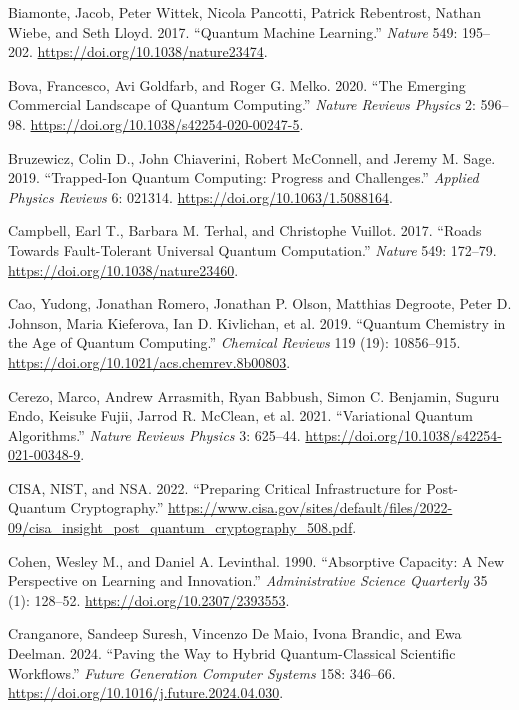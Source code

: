 \documentclass[
  11pt,
  letterpaper,
]{article}
\newlength{\cslhangindent}
\newenvironment{CSLReferences}[2] %
 {\begin{list}{}{%
  \setlength{\itemindent}{0pt}
  \setlength{\leftmargin}{0pt}
  \setlength{\parsep}{0pt}
  \ifodd #1
   \setlength{\leftmargin}{\cslhangindent}
   \setlength{\itemindent}{-1\cslhangindent}
  \fi
  \setlength{\itemsep}{#2\baselineskip}}}
 {\end{list}}
\begin{document}
\begin{CSLReferences}{1}{0}
Biamonte, Jacob, Peter Wittek, Nicola Pancotti, Patrick Rebentrost,
Nathan Wiebe, and Seth Lloyd. 2017. {``Quantum Machine Learning.''}
\emph{Nature} 549: 195--202. \url{https://doi.org/10.1038/nature23474}.

Bova, Francesco, Avi Goldfarb, and Roger G. Melko. 2020. {``The Emerging
Commercial Landscape of Quantum Computing.''} \emph{Nature Reviews
Physics} 2: 596--98. \url{https://doi.org/10.1038/s42254-020-00247-5}.

Bruzewicz, Colin D., John Chiaverini, Robert McConnell, and Jeremy M.
Sage. 2019. {``Trapped-Ion Quantum Computing: Progress and
Challenges.''} \emph{Applied Physics Reviews} 6: 021314.
\url{https://doi.org/10.1063/1.5088164}.

Campbell, Earl T., Barbara M. Terhal, and Christophe Vuillot. 2017.
{``Roads Towards Fault-Tolerant Universal Quantum Computation.''}
\emph{Nature} 549: 172--79. \url{https://doi.org/10.1038/nature23460}.

Cao, Yudong, Jonathan Romero, Jonathan P. Olson, Matthias Degroote,
Peter D. Johnson, Maria Kieferova, Ian D. Kivlichan, et al. 2019.
{``Quantum Chemistry in the Age of Quantum Computing.''} \emph{Chemical
Reviews} 119 (19): 10856--915.
\url{https://doi.org/10.1021/acs.chemrev.8b00803}.

Cerezo, Marco, Andrew Arrasmith, Ryan Babbush, Simon C. Benjamin, Suguru
Endo, Keisuke Fujii, Jarrod R. McClean, et al. 2021. {``Variational
Quantum Algorithms.''} \emph{Nature Reviews Physics} 3: 625--44.
\url{https://doi.org/10.1038/s42254-021-00348-9}.

CISA, NIST, and NSA. 2022. {``Preparing Critical Infrastructure for
Post-Quantum Cryptography.''}
\url{https://www.cisa.gov/sites/default/files/2022-09/cisa_insight_post_quantum_cryptography_508.pdf}.

Cohen, Wesley M., and Daniel A. Levinthal. 1990. {``Absorptive Capacity:
A New Perspective on Learning and Innovation.''} \emph{Administrative
Science Quarterly} 35 (1): 128--52.
\url{https://doi.org/10.2307/2393553}.

Cranganore, Sandeep Suresh, Vincenzo De Maio, Ivona Brandic, and Ewa
Deelman. 2024. {``Paving the Way to Hybrid Quantum-Classical Scientific
Workflows.''} \emph{Future Generation Computer Systems} 158: 346--66.
\url{https://doi.org/10.1016/j.future.2024.04.030}.


\end{CSLReferences}
\end{document}

